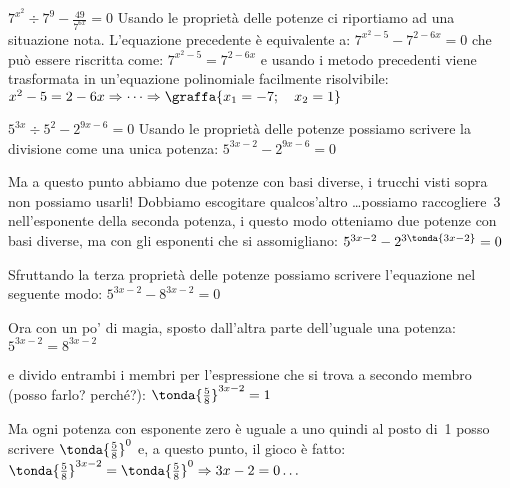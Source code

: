 \begin{esempio}
\(7^{x^2} \div 7^9 - \frac{49}{7^{6x}} = 0\) Usando le proprietà delle potenze 
ci riportiamo ad una situazione nota. 
L'equazione precedente è equivalente a: 
\(7^{x^2-5} - 7^{2-6x} = 0\) che può essere riscritta come:
\(7^{x^2-5} = 7^{2-6x}\) e usando i metodo precedenti viene 
trasformata in un'equazione polinomiale facilmente risolvibile:
\(x^2-5 = 2-6x \Rightarrow \dots \Rightarrow \graffa{x_1=-7;\quad x_2=1}\)
\end{esempio}

\begin{esempio}
\({5}^{3x} \div 5^2-{2}^{9x-6}=0\)
Usando le proprietà delle potenze possiamo scrivere la divisione come una 
unica potenza:
\({5}^{3x-2}-{2}^{9x-6}=0\)

Ma a questo punto abbiamo due potenze con basi diverse, i trucchi visti sopra 
non possiamo usarli! Dobbiamo escogitare qualcos'altro \dots possiamo 
raccogliere~3 nell'esponente della seconda potenza, i questo modo otteniamo due 
potenze con basi diverse, ma con gli esponenti che si assomigliano:
\({5}^{3x-2}-{2}^{3\tonda{3x-2}}=0\)

Sfruttando la terza proprietà delle potenze possiamo scrivere l'equazione nel 
seguente modo:
\({5}^{3x-2}-{8}^{3x-2}=0\)

Ora con un po' di magia, sposto dall'altra parte dell'uguale una potenza:
\({5}^{3x-2}={8}^{3x-2}\)

e divido entrambi i membri per l'espressione che si trova a secondo membro 
(posso farlo? perché?):
\(\tonda{\frac{5}{8}}^{3x-2}=1\)

Ma ogni potenza con esponente zero è uguale a uno quindi al posto di~1 posso 
scrivere \(\tonda{\frac{5}{8}}^{0}\) e, a questo punto, il gioco è fatto:
\(\tonda{\frac{5}{8}}^{3x-2}=\tonda{\frac{5}{8}}^{0} \Rightarrow 3x-2=0 \dots\) 
\end{esempio}

